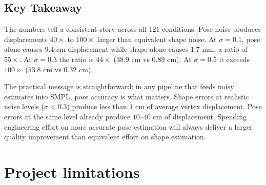 \documentclass[final]{article}
\begin{document}
\subsection{Key Takeaway}

The numbers tell a consistent story across all 121 conditions. Pose noise 
produces displacements $40\times$ to $100\times$ larger than equivalent shape 
noise. At $\sigma = 0.1$, pose alone causes $9.4$ cm displacement while shape 
alone causes $1.7$ mm, a ratio of $55\times$. At $\sigma = 0.3$ the ratio 
is $44\times$ ($38.9$ cm vs $0.89$ cm). At $\sigma = 0.5$ it exceeds 
$100\times$ ($53.8$ cm vs $0.32$ cm).

The practical message is straightforward: in any pipeline that feeds noisy 
estimates into SMPL, pose accuracy is what matters. Shape errors at realistic 
noise levels ($\sigma < 0.3$) produce less than $1$ cm of average vertex 
displacement. Pose errors at the same level already produce $10$--$40$ cm of 
displacement. Spending engineering effort on more accurate pose estimation will 
always deliver a larger quality improvement than equivalent effort on shape 
estimation.

\section{Project limitations}\label{sec:limits}
\end{document}
